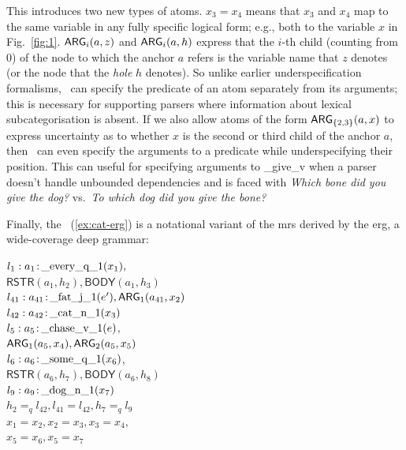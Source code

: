 This introduces two new types of atoms.   $x_3=x_4$
means that $x_3$ and $x_4$ map to the same
variable in any fully specific logical form; e.g., both to the
variable $x$ in Fig.~\ref{fig:1}.   $\mathsf{ARG}_i(a,z)$ and
$\mathsf{ARG}_i(a,h)$ express that the $i$-th child (counting from 0) of the
node to which the anchor $a$ refers is the variable name that $z$
denotes (or the node that the {\em hole} $h$ denotes).  So unlike
earlier underspecification formalisms, \rmrs\ can specify the
predicate of an atom separately from its
arguments; this is necessary for supporting parsers where information
about lexical subcategorisation is absent. If we also allow atoms of
the form $\mathsf{ARG}_{\{2,3\}}(a,x)$ to express uncertainty as to whether
$x$ is the second or third child of the anchor $a$, then \rmrs\ can
even specify the arguments to a predicate while underspecifying their
position.  This can useful for specifying arguments to \_give\_v when a
parser doesn't handle unbounded dependencies and is faced with
{\em Which bone did you give the dog?} vs.\ {\em To which dog did you
  give the bone?}

Finally, the \rmrs\ (\ref{ex:cat-erg}) is a notational variant of the
{\sc mrs} derived by the {\sc erg}, a wide-coverage deep grammar:
\begin{examples}
\item $l_1:a_1\colon\!\mathrm{\_every\_q\_1}(x_1),$\\
\hspace*{0.1in}$\mathsf{RSTR}(a_1,h_2),
\mathsf{BODY}(a_1,h_3)$\\ 
$l_{41}:a_{41}\colon\!\mathrm{\_fat\_j\_1}(e'), \mathsf{ARG}_1(a_{41},x_2)$\\
$l_{42}:a_{42}\colon\!\mathrm{\_cat\_n\_1}(x_3)$\\
$l_5:a_5\colon\!\mathrm{\_chase\_v\_1}(e)$,\\
\hspace*{0.1in}$\mathsf{ARG}_1(a_5,x_4),
\mathsf{ARG}_2(a_5,x_5)$\\ 
$l_6:a_6\colon\!\mathrm{\_some\_q\_1}(x_6)$,\\
\hspace*{0.1in}$\mathsf{RSTR}(a_6,h_7),
\mathsf{BODY}(a_6,h_8)$\\ 
$l_9:a_9\colon\!\mathrm{\_dog\_n\_1}(x_7)$\\
$h_2=_q l_{42}, l_{41}=l_{42}, h_7 =_q l_9$\\
$x_1=x_2, x_2=x_3, x_3=x_4,$\\
$x_5=x_6, x_5=x_7$
\label{ex:cat-erg}
\end{examples}

